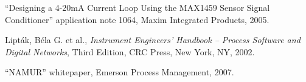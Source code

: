 
\noindent
``Designing a 4-20mA Current Loop Using the MAX1459 Sensor Signal Conditioner'' application note 1064, Maxim Integrated Products, 2005.  

\vskip 10pt

\noindent
Lipt\'ak, B\'ela G. et al., \textit{Instrument Engineers' Handbook -- Process Software and Digital Networks}, Third Edition, CRC Press, New York, NY, 2002.

\vskip 10pt

\noindent
``NAMUR'' whitepaper, Emerson Process Management, 2007.




















